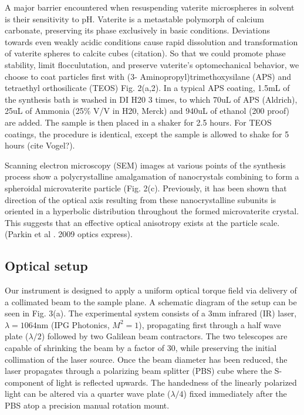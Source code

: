 \documentclass[12pt]{article}
\begin{document}
A major barrier encountered when resuspending vaterite microspheres in solvent is their sensitivity to pH. Vaterite is a metastable polymorph of calcium carbonate, preserving its phase exclusively in basic conditions. Deviations towards even weakly acidic conditions cause rapid dissolution and transformation of vaterite spheres to calcite cubes (citation). So that we could promote phase stability, limit flocculutation, and preserve vaterite's optomechanical behavior, we choose to coat particles first with (3- Aminopropyl)trimethoxysilane (APS) and tetraethyl orthosilicate (TEOS) Fig. 2(a,2). In a typical APS coating, 1.5mL of the synthesis bath is washed in DI H20 3 times, to which 70uL of APS (Aldrich), 25uL of Ammonia (25\% V/V in H20, Merck) and 940uL of ethanol (200 proof) are added. The sample is then placed in a shaker for 2.5 hours. For TEOS coatings, the procedure is identical, except the sample is allowed to shake for 5 hours (cite Vogel?). 

Scanning electron microscopy (SEM) images at various points of the synthesis process show a polycrystalline amalgamation of nanocrystals combining to form a spheroidal microvaterite particle (Fig. 2(c). Previously, it has been shown that direction of the optical axis resulting from these nanocrystalline subunits is oriented in a hyperbolic distribution throughout the formed microvaterite crystal. This suggests that an effective optical anisotropy exists at the particle scale. (Parkin et al . 2009 optics express).
\subsection*{Optical setup}
Our instrument is designed to apply a uniform optical torque field via delivery of a collimated beam to the sample plane. A schematic diagram of the setup can be seen in Fig. 3(a). The experimental system consists of a 3mm infrared (IR) laser, $\lambda=1064$nm (IPG Photonics, $M^{2}=1$), propagating first through a half wave plate ($\lambda/2$) followed by two Galilean beam contractors. The two telescopes are capable of shrinking the beam by a factor of 30, while preserving the initial collimation of the laser source. Once the beam diameter has been reduced, the laser propagates through a polarizing beam splitter (PBS) cube where the S-component of light is reflected upwards. The handedness of the linearly polarized light can be altered via a quarter wave plate ($\lambda/4$) fixed immediately after the PBS atop a precision manual rotation mount. 
\end{document}
